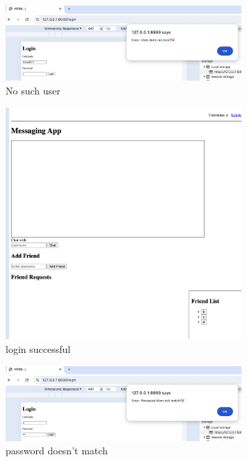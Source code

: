 \documentclass[12pt]{article}
\begin{document}
        \begin{figure}[H]
            \centering
            \includegraphics[width=0.8\textwidth]{graphs/no_such_user_login.jpg}
            \caption{No such user}
            \label{No such user}
        \end{figure}

        \begin{figure}[H]
            \centering
            \includegraphics[width=0.8\textwidth]{graphs/login_successful.png}
            \caption{login successful}
            \label{login successful}
        \end{figure}

        \begin{figure}[H]
            \centering
            \includegraphics[width=0.8\textwidth]{graphs/passwd_does_not_match.png}
            \caption{password doesn't match}
            \label{password doesn't match}
        \end{figure}
\end{document}
